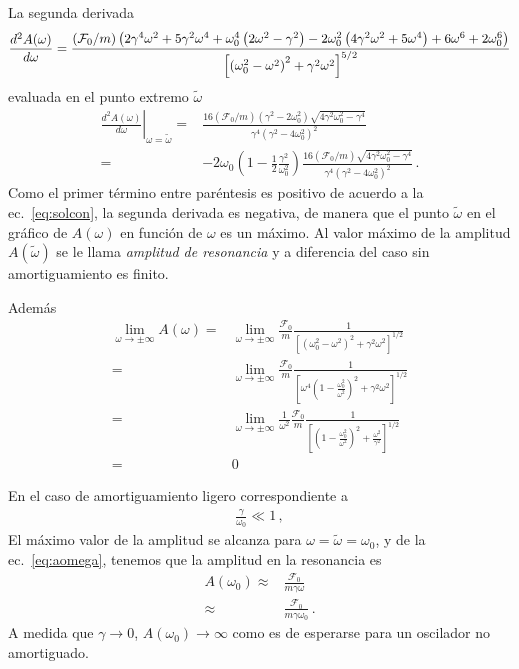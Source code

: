 La segunda derivada
\begin{align*}
  \frac{d^2A(\omega)}{d\omega}=
\frac{(\mathcal{F}_0/m) \left(2 \gamma ^4 \omega
   ^2+5 \gamma ^2 \omega ^4+\omega
   _0^4 \left(2 \omega ^2-\gamma
   ^2\right)-2 \omega _0^2 \left(4
   \gamma ^2 \omega ^2+5 \omega
   ^4\right)+6 \omega ^6+2 \omega
   _0^6\right)}{%
\left[\left(\omega_0^2-\omega^2\right)^2+\gamma^2\omega^2\right]^{5/2}}
\end{align*}
evaluada en el punto extremo $\tilde\omega$
\begin{align*}
  \left.\frac{d^2A(\omega)}{d\omega}\right|_{\omega=\tilde\omega}=&
  \frac{16 (\mathcal{F}_0/m) \left(\gamma^2-2 \omega_0^2\right) \sqrt{4 \gamma^2\omega_0^2-\gamma^4}}{
  \gamma^4 \left(\gamma^2-4 \omega_0^2\right)^2}\nonumber\\
=&
  -2\omega_0\left(1-\frac{1}{2}\frac{\gamma^2}{\omega_0^2}\right)\frac{16 (\mathcal{F}_0/m)  \sqrt{4 \gamma^2\omega_0^2-\gamma^4}}{\gamma^4 \left(\gamma^2-4 \omega_0^2\right)^2}\,.
\end{align*}
Como el primer término entre paréntesis es positivo de acuerdo a la ec.~\eqref{eq:solcon}, la segunda derivada es negativa, de manera que el punto $\tilde\omega$ en el gráfico de $A(\omega)$ en función de $\omega$ es un máximo. Al valor máximo de la amplitud $A(\tilde\omega)$ se le llama \emph{amplitud de resonancia} y a diferencia del caso sin amortiguamiento es finito.

Además
\begin{align}
  \lim_{\omega\to \pm\infty}A(\omega)=&
\lim_{\omega\to \pm\infty}\frac{\mathcal{F}_0}{m}\frac{1}{\left[\left(\omega_0^2-\omega^2\right)^2+\gamma^2\omega^2\right]^{1/2}}\nonumber\\
=&
\lim_{\omega\to \pm\infty}\frac{\mathcal{F}_0}{m}\frac{1}{\left[\omega^4\left(1-\frac{\omega_0^2}{\omega^2}\right)^2+\gamma^2\omega^2\right]^{1/2}}\nonumber\\
=&
\lim_{\omega\to \pm\infty}\frac{1}{\omega^2}\frac{\mathcal{F}_0}{m}\frac{1}{\left[\left(1-\frac{\omega_0^2}{\omega^2}\right)^2+\frac{\omega^2}{\gamma^2}\right]^{1/2}}\nonumber\\
=&0\,
\end{align}

En el caso de amortiguamiento ligero correspondiente a
\begin{align*}
  \frac{\gamma}{\omega_0}\ll 1\,,
\end{align*}
El máximo valor de la amplitud se alcanza para $\omega=\tilde\omega=\omega_0$, y de la ec.~\eqref{eq:aomega}, tenemos que la amplitud en la resonancia es
\begin{align*}
  A(\omega_0)\approx&\frac{\mathcal{F}_0}{m\gamma\omega}\nonumber\\
\approx&\frac{\mathcal{F}_0}{m\gamma\omega_0}\,.
\end{align*}
A medida que $\gamma\to0$, $A(\omega_0)\to\infty$ como es de esperarse para un oscilador no amortiguado.


